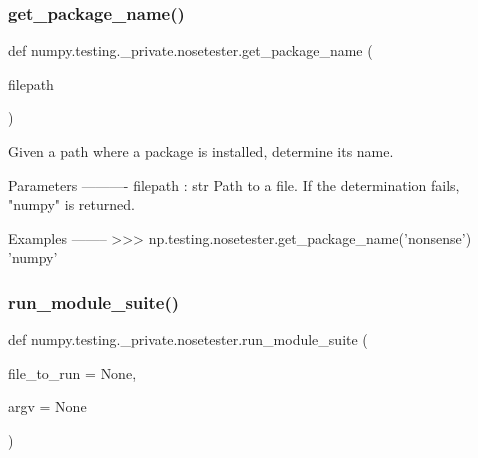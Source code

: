 \subsubsection{\texorpdfstring{get\+\_\+package\+\_\+name()}{get\_package\_name()}}
{\footnotesize\ttfamily def numpy.\+testing.\+\_\+private.\+nosetester.\+get\+\_\+package\+\_\+name (\begin{DoxyParamCaption}\item[{}]{filepath }\end{DoxyParamCaption})}

\begin{DoxyVerb}Given a path where a package is installed, determine its name.

Parameters
----------
filepath : str
    Path to a file. If the determination fails, "numpy" is returned.

Examples
--------
>>> np.testing.nosetester.get_package_name('nonsense')
'numpy'\end{DoxyVerb}
 \mbox{\label{namespacenumpy_1_1testing_1_1__private_1_1nosetester_ab2fa64ee08ede16c8dabb87785e8cc54}} 
\subsubsection{\texorpdfstring{run\+\_\+module\+\_\+suite()}{run\_module\_suite()}}
{\footnotesize\ttfamily def numpy.\+testing.\+\_\+private.\+nosetester.\+run\+\_\+module\+\_\+suite (\begin{DoxyParamCaption}\item[{}]{file\+\_\+to\+\_\+run = {\ttfamily None},  }\item[{}]{argv = {\ttfamily None} }\end{DoxyParamCaption})}

